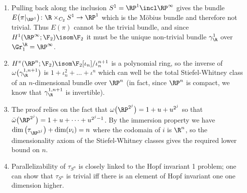 \begin{answers}
	\leavevmode
	\begin{enumerate}
		\item {} Pulling back along the inclusion $S^1 = \RP^1 \incl \RP^\infty$ gives the bundle $E\big(\pi|_{\RP^1}\big)\colon \R \times_{C_2} S^1 \to \RP^1$ which is the Möbius bundle and therefore not trivial.
			Thus $E(\pi)$ cannot be the trivial bundle, and since $H^1(\RP^\infty; \F_2) \isom \F_2$ it must be the unique non-trivial bundle $\gamma_\R^1$ over $\Gr_1^\R = \RP^\infty$.
		\item $H^\pi(\RP^n; \F_2) \isom \F_2[\iota_n] / \iota_n^{n + 1}$ is a polynomial ring, so the inverse of $\omega\big(\gamma_\R^{1, n + 1}\big)$ is $1 + \iota_n^2 + \ldots + \iota^n$ which can well be the total Stiefel-Whitney class of an $n$-dimensional bundle over $\RP^n$ (in fact, since $\RP^n$ is compact, we know that $\gamma_\R^{1, n + 1}$ is invertible).
		\item The proof relies on the fact that $\omega\big(\RP^{2^j}\big) = 1 + u + u^{2^j}$ so that $\bar{\omega}\big(\RP^{2^j}\big) = 1 + u + \cdots + u^{2^j - 1}$.
			By the immersion property we have $\dim\big(\tau_{\RP^{2^j}}\big) + \dim(\nu_i) = n$ where the codomain of $i$ is $\R^n$, so the dimensionality axiom of the Stiefel-Whitney classes gives the required lower bound on $n$.
		\item {} Parallelizability of $\tau_{S^n}$ is closely linked to the Hopf invariant 1 problem; one can show that $\tau_{S^n}$ is trivial iff there is an element of Hopf invariant one one dimension higher.


\end{enumerate}
\end{answers}
